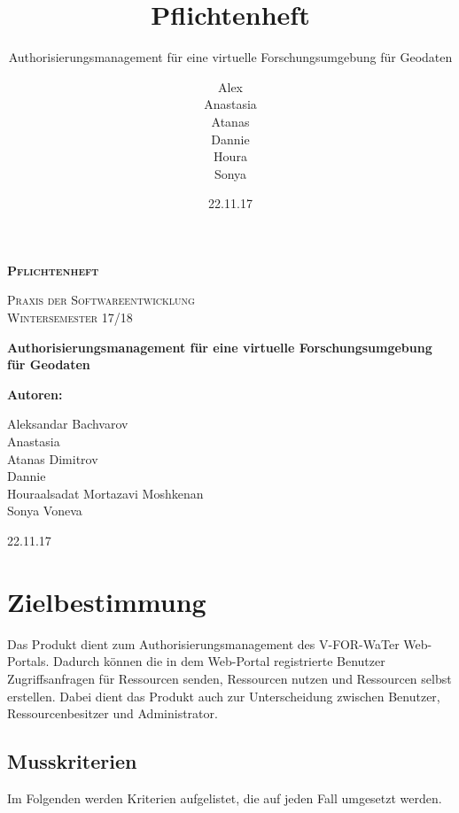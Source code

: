 \documentclass[parskip=full,11pt]{scrartcl}
\title{Pflichtenheft}
\subtitle{Authorisierungsmanagement für eine virtuelle Forschungsumgebung für Geodaten}
\author{Alex\\Anastasia\\Atanas\\Dannie\\ Houra\\Sonya\\}
\date{22.11.17}
\begin{document}
\begin{titlepage}
	
	\begin{center}
	{\scshape\LARGE\bfseries Pflichtenheft \par}
	\vspace{1cm}
	{\scshape\Large Praxis der Softwareentwicklung\\}
	\vspace{1cm}
	{\scshape\Large Wintersemester 17/18\\}
	\vspace{3cm}
	{\huge\bfseries Authorisierungsmanagement für eine virtuelle Forschungsumgebung für Geodaten\par}
	\vspace{2cm}
	\vfill
	{\bfseries {\Large Autoren}:\par}
	{\Large Aleksandar Bachvarov}\\
	{\Large Anastasia}\\%
	{\Large Atanas Dimitrov}\\
	{\Large Dannie}\\%
	{\Large Houraalsadat Mortazavi Moshkenan}\\
	{\Large Sonya Voneva}\\
	\vfill
	{\large 22.11.17 \par}
	\end{center}
\end{titlepage}
\tableofcontents

\newpage
\section{Zielbestimmung}
Das Produkt dient zum Authorisierungsmanagement des \gls{V-FOR-WaTer} Web-Portals. Dadurch können die in dem \gls{Web-Portal} registrierte \gls{Benutzer} Zugriffsanfragen für Ressourcen senden, Ressourcen nutzen und Ressourcen selbst erstellen. Dabei dient das Produkt auch zur Unterscheidung zwischen Benutzer, \gls{Ressourcenbesitzer} und \gls{Administrator}.

\subsection{Musskriterien}
Im Folgenden werden Kriterien aufgelistet, die auf jeden Fall umgesetzt werden.
\end{document}
